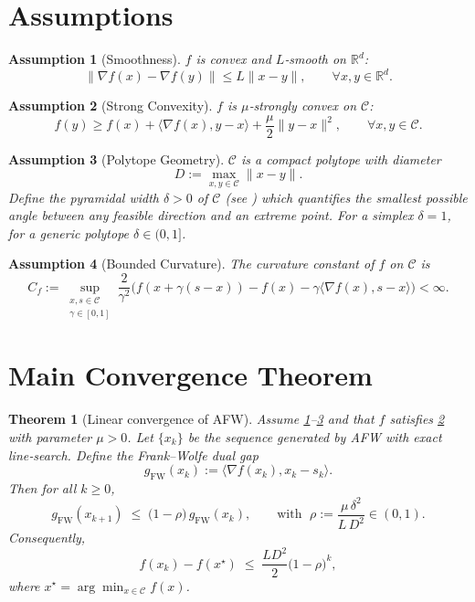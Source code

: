 \documentclass{article}
\newtheorem{theorem}{Theorem}[section]
\newtheorem{assumption}{Assumption}[section]
\begin{document}
\newpage
\section*{Assumptions}
\begin{assumption}[Smoothness]\label{ass:smooth}
$f$ is convex and $L$‑smooth on $\mathbb R^d$:
\[
\|\nabla f(x)-\nabla f(y)\|\le L\|x-y\|,\qquad\forall x,y\in\mathbb R^d .
\]
\end{assumption}
\begin{assumption}[Strong Convexity]\label{ass:strong}
$f$ is $\mu$‑strongly convex on $\mathcal C$:
\[
f(y)\ge f(x)+\langle\nabla f(x),y-x\rangle+\frac{\mu}{2}\|y-x\|^2,\qquad\forall x,y\in\mathcal C .
\]
\end{assumption}
\begin{assumption}[Polytope Geometry]\label{ass:poly}
$\mathcal C$ is a compact polytope with diameter
\[
D:=\max_{x,y\in\mathcal C}\|x-y\|.
\]
Define the \emph{pyramidal width} $\delta>0$ of $\mathcal C$ (see \cite{lacoste2015linear}) which quantifies the smallest possible angle between any feasible direction and an extreme point.  For a simplex $\delta=1$, for a generic polytope $\delta\in(0,1]$.
\end{assumption}
\begin{assumption}[Bounded Curvature]\label{ass:curv}
The curvature constant of $f$ on $\mathcal C$ is
\[
C_f:=\sup_{\substack{x,s\in\mathcal C\\ \gamma\in[0,1]}}
\frac{2}{\gamma^2}\bigl(f(x+\gamma(s-x))-f(x)-\gamma\langle\nabla f(x),s-x\rangle\bigr)<\infty .
\]
\end{assumption}

\section*{Main Convergence Theorem}
\begin{theorem}[Linear convergence of AFW]\label{thm:linear}
Assume \ref{ass:smooth}–\ref{ass:poly} and that $f$ satisfies \ref{ass:strong} with parameter $\mu>0$.  Let $\{x_k\}$ be the sequence generated by AFW with exact line‑search.  Define the Frank–Wolfe dual gap
\[
g_{\text{FW}}(x_k):=\langle\nabla f(x_k),x_k-s_k\rangle .
\]
Then for all $k\ge0$,
\[
g_{\text{FW}}(x_{k+1})\;\le\;\bigl(1-\rho\bigr)\,g_{\text{FW}}(x_k),
\qquad\text{with }\;
\rho:=\frac{\mu\,\delta^2}{L\,D^2}\in(0,1).
\]
Consequently,
\[
f(x_k)-f(x^\star)\;\le\;\frac{L D^2}{2}\bigl(1-\rho\bigr)^k ,
\]
where $x^\star=\arg\min_{x\in\mathcal C}f(x)$.
\end{theorem}
\end{document}
